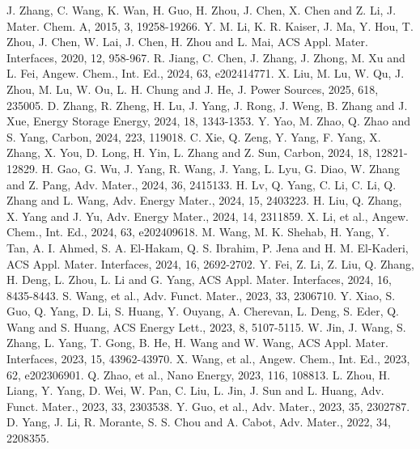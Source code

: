 \documentclass[12pt,a4paper,twocolumn]{article} %
\newcommand{\english}[1]{\textenglish{#1}}
\begin{document}
 \english{J. Zhang, C. Wang, K. Wan, H. Guo, H. Zhou, J. Chen, X. Chen and Z. Li, J. Mater. Chem. A, 2015, 3, 19258-19266.}
 \english{Y. M. Li, K. R. Kaiser, J. Ma, Y. Hou, T. Zhou, J. Chen, W. Lai, J. Chen, H. Zhou and L. Mai, ACS Appl. Mater. Interfaces, 2020, 12, 958-967.}
 \english{R. Jiang, C. Chen, J. Zhang, J. Zhong, M. Xu and L. Fei, Angew. Chem., Int. Ed., 2024, 63, e202414771.}
 \english{X. Liu, M. Lu, W. Qu, J. Zhou, M. Lu, W. Ou, L. H. Chung and J. He, J. Power Sources, 2025, 618, 235005.}
 \english{D. Zhang, R. Zheng, H. Lu, J. Yang, J. Rong, J. Weng, B. Zhang and J. Xue, Energy Storage Energy, 2024, 18, 1343-1353.}
 \english{Y. Yao, M. Zhao, Q. Zhao and S. Yang, Carbon, 2024, 223, 119018.}
 \english{C. Xie, Q. Zeng, Y. Yang, F. Yang, X. Zhang, X. You, D. Long, H. Yin, L. Zhang and Z. Sun, Carbon, 2024, 18, 12821-12829.}
 \english{H. Gao, G. Wu, J. Yang, R. Wang, J. Yang, L. Lyu, G. Diao, W. Zhang and Z. Pang, Adv. Mater., 2024, 36, 2415133.}
 \english{H. Lv, Q. Yang, C. Li, C. Li, Q. Zhang and L. Wang, Adv. Energy Mater., 2024, 15, 2403223.}
 \english{H. Liu, Q. Zhang, X. Yang and J. Yu, Adv. Energy Mater., 2024, 14, 2311859.}
 \english{X. Li, et al., Angew. Chem., Int. Ed., 2024, 63, e202409618.}
 \english{M. Wang, M. K. Shehab, H. Yang, Y. Tan, A. I. Ahmed, S. A. El-Hakam, Q. S. Ibrahim, P. Jena and H. M. El-Kaderi, ACS Appl. Mater. Interfaces, 2024, 16, 2692-2702.}
 \english{Y. Fei, Z. Li, Z. Liu, Q. Zhang, H. Deng, L. Zhou, L. Li and G. Yang, ACS Appl. Mater. Interfaces, 2024, 16, 8435-8443.}
 \english{S. Wang, et al., Adv. Funct. Mater., 2023, 33, 2306710.}
 \english{Y. Xiao, S. Guo, Q. Yang, D. Li, S. Huang, Y. Ouyang, A. Cherevan, L. Deng, S. Eder, Q. Wang and S. Huang, ACS Energy Lett., 2023, 8, 5107-5115.}
 \english{W. Jin, J. Wang, S. Zhang, L. Yang, T. Gong, B. He, H. Wang and W. Wang, ACS Appl. Mater. Interfaces, 2023, 15, 43962-43970.}
 \english{X. Wang, et al., Angew. Chem., Int. Ed., 2023, 62, e202306901.}
 \english{Q. Zhao, et al., Nano Energy, 2023, 116, 108813.}
 \english{L. Zhou, H. Liang, Y. Yang, D. Wei, W. Pan, C. Liu, L. Jin, J. Sun and L. Huang, Adv. Funct. Mater., 2023, 33, 2303538.}
 \english{Y. Guo, et al., Adv. Mater., 2023, 35, 2302787.}
 \english{D. Yang, J. Li, R. Morante, S. S. Chou and A. Cabot, Adv. Mater., 2022, 34, 2208355.}
\end{document}
